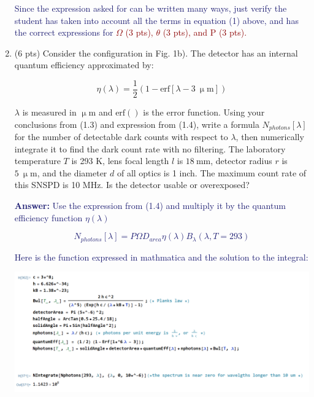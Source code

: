 \documentclass[11pt]{caltech_thesis} %
\begin{document}
\begin{enumerate}
{  }

  \textcolor{midnightblue}{ Since the expression asked for can be
  written many ways, just verify the student has taken into account all
  the terms in equation (1) above, and has the correct expressions for}
  \textcolor{darkred}{\(\Omega\) (3 pts), \(\theta\) (3 pts), and P (3
  pts).}
\item
  (6 pts) Consider the configuration in Fig. 1b). The detector has an
  internal quantum efficiency approximated by:

  \[\eta(\lambda) = \frac{1}{2}(1 - \text{erf}[\lambda - 3~\mathrm{\upmu m}]) \]

  \(\lambda\) is measured in \(\mathrm{\upmu m}\) and \(\text{erf}()\)
  is the error function. Using your conclusions from (1.3) and
  expression from (1.4), write a formula \(N_{photons}[\lambda]\) for
  the number of detectable dark counts with respect to \(\lambda\), then
  numerically integrate it to find the dark count rate with no
  filtering. The laboratory temperature \(T\) is 293 K, lens focal
  length \(l\) is \(18~\text{mm}\), detector radius \(r\) is
  \(5~\mathrm{\upmu m}\), and the diameter \(d\) of all optics is 1
  inch. The maximum count rate of this SNSPD is 10 MHz. Is the detector
  usable or overexposed?

  \textcolor{midnightblue}{ \textbf{Answer:} }
  \textcolor{midnightblue}{Use the expression from (1.4) and multiply it
  by the quantum efficiency function \(\eta(\lambda)\) }

  \textcolor{midnightblue}{

  \[N_{photons}[\lambda] = P \Omega D_{area} \eta(\lambda) B_{\lambda}(\lambda, T=293)\]

  }

  \textcolor{midnightblue}{ Here is the function expressed in mathmatica
  and the solution to the integral: }

  \textcolor{midnightblue}{\includegraphics{chapter_05/figs_05/mathematica_2.PNG}}


\end{enumerate}
\end{document}
